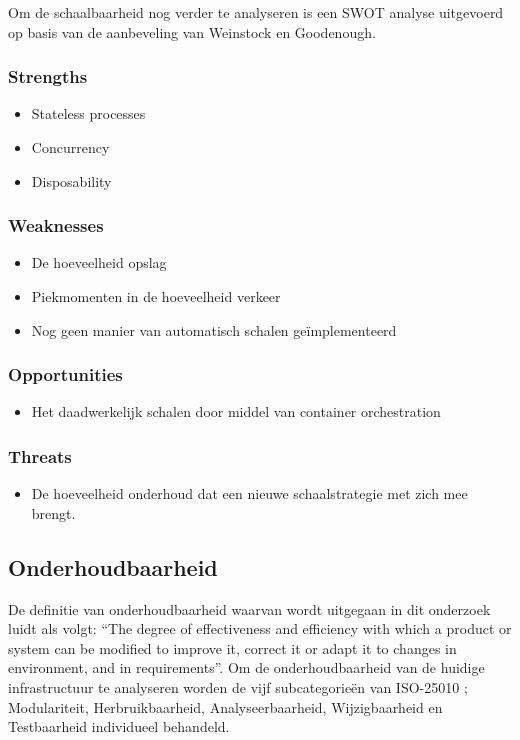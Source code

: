Om de schaalbaarheid nog verder te analyseren is een SWOT analyse uitgevoerd op basis van de aanbeveling van Weinstock en Goodenough.

\subsubsection{Strengths}
\begin{itemize}
	\item Stateless processes
	\item Concurrency
	\item Disposability
\end{itemize}

\subsubsection{Weaknesses}
\begin{itemize}
	\item De hoeveelheid opslag
	\item Piekmomenten in de hoeveelheid verkeer
	\item Nog geen manier van automatisch schalen geïmplementeerd
\end{itemize}

\subsubsection{Opportunities}
\begin{itemize}
	\item Het daadwerkelijk schalen door middel van container orchestration
\end{itemize}

\subsubsection{Threats}
\begin{itemize}
	\item De hoeveelheid onderhoud dat een nieuwe schaalstrategie met zich mee brengt.
\end{itemize}


\subsection{Onderhoudbaarheid}
De definitie van onderhoudbaarheid waarvan wordt uitgegaan in dit onderzoek luidt als volgt: \enquote{The degree of effectiveness and efficiency with which a product or system can be modified to improve it, correct it or adapt it to changes in environment, and in requirements}. Om de onderhoudbaarheid van de huidige infrastructuur te analyseren worden de vijf subcategorieën van ISO-25010 \parencite{ISO25010}; Modulariteit, Herbruikbaarheid, Analyseerbaarheid, Wijzigbaarheid en Testbaarheid individueel behandeld.

